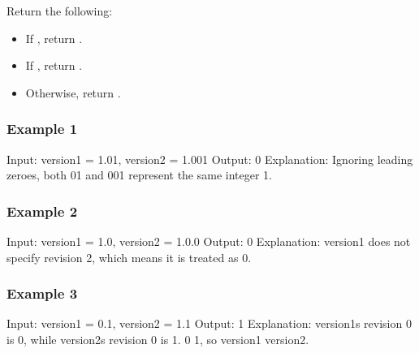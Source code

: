 \documentclass[letterpaper,12pt,english]{book}
\begin{document}
\sphinxAtStartPar
Return the following:
\begin{itemize}
\item {} 
\sphinxAtStartPar
If , return .

\item {} 
\sphinxAtStartPar
If , return .

\item {} 
\sphinxAtStartPar
Otherwise, return .

\end{itemize}


\subsubsection{Example 1}
\label{\detokenize{String/08_STR_165_Compare_Version_Numbers:example-1}}
\begin{sphinxVerbatim}[commandchars=\\\{\}]
Input: version1 = \PYGZdq{}1.01\PYGZdq{}, version2 = \PYGZdq{}1.001\PYGZdq{}
Output: 0
Explanation: Ignoring leading zeroes, both \PYGZdq{}01\PYGZdq{} and \PYGZdq{}001\PYGZdq{} represent the same integer \PYGZdq{}1\PYGZdq{}.
\end{sphinxVerbatim}


\subsubsection{Example 2}
\label{\detokenize{String/08_STR_165_Compare_Version_Numbers:example-2}}
\begin{sphinxVerbatim}[commandchars=\\\{\}]
Input: version1 = \PYGZdq{}1.0\PYGZdq{}, version2 = \PYGZdq{}1.0.0\PYGZdq{}
Output: 0
Explanation: version1 does not specify revision 2, which means it is treated as \PYGZdq{}0\PYGZdq{}.
\end{sphinxVerbatim}


\subsubsection{Example 3}
\label{\detokenize{String/08_STR_165_Compare_Version_Numbers:example-3}}
\begin{sphinxVerbatim}[commandchars=\\\{\}]
Input: version1 = \PYGZdq{}0.1\PYGZdq{}, version2 = \PYGZdq{}1.1\PYGZdq{}
Output: \PYGZhy{}1
Explanation: version1\PYGZsq{}s revision 0 is \PYGZdq{}0\PYGZdq{}, while version2\PYGZsq{}s revision 0 is \PYGZdq{}1\PYGZdq{}. 0 \PYGZlt{} 1, so version1 \PYGZlt{} version2.
\end{sphinxVerbatim}
\end{document}
